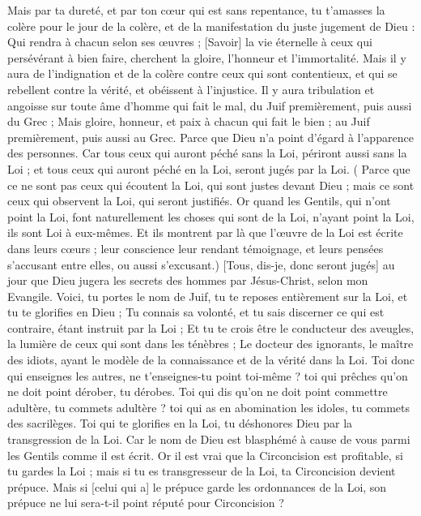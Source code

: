 \begin{multicols}{2}
Mais par ta dureté, et par ton cœur qui est sans repentance, tu t'amasses la colère pour le jour de la colère, et de la manifestation du juste jugement de Dieu :
Qui rendra à chacun selon ses œuvres ;
[Savoir] la vie éternelle à ceux qui persévérant à bien faire, cherchent la gloire, l'honneur et l'immortalité.
Mais il y aura de l'indignation et de la colère contre ceux qui sont contentieux, et qui se rebellent contre la vérité, et obéissent à l'injustice.
Il y aura tribulation et angoisse sur toute âme d'homme qui fait le mal, du Juif premièrement, puis aussi du Grec ;
Mais gloire, honneur, et paix à chacun qui fait le bien ; au Juif premièrement, puis aussi au Grec.
Parce que Dieu n'a point d'égard à l'apparence des personnes.
Car tous ceux qui auront péché sans la Loi, périront aussi sans la Loi ; et tous ceux qui auront péché en la Loi, seront jugés par la Loi.
( Parce que ce ne sont pas ceux qui écoutent la Loi, qui sont justes devant Dieu ; mais ce sont ceux qui observent la Loi, qui seront justifiés.
Or quand les Gentils, qui n'ont point la Loi, font naturellement les choses qui sont de la Loi, n'ayant point la Loi, ils sont Loi à eux-mêmes.
Et ils montrent par là que l'œuvre de la Loi est écrite dans leurs cœurs ; leur conscience leur rendant témoignage, et leurs pensées s'accusant entre elles, ou aussi s'excusant.)
[Tous, dis-je, donc seront jugés] au jour que Dieu jugera les secrets des hommes par Jésus-Christ, selon mon Evangile.
Voici, tu portes le nom de Juif, tu te reposes entièrement sur la Loi, et tu te glorifies en Dieu ;
Tu connais sa volonté, et tu sais discerner ce qui est contraire, étant instruit par la Loi ;
Et tu te crois être le conducteur des aveugles, la lumière de ceux qui sont dans les ténèbres ;
Le docteur des ignorants, le maître des idiots, ayant le modèle de la connaissance et de la vérité dans la Loi.
Toi donc qui enseignes les autres, ne t'enseignes-tu point toi-même ? toi qui prêches qu'on ne doit point dérober, tu dérobes.
Toi qui dis qu'on ne doit point commettre adultère, tu commets adultère ? toi qui as en abomination les idoles, tu commets des sacrilèges.
Toi qui te glorifies en la Loi, tu déshonores Dieu par la transgression de la Loi.
Car le nom de Dieu est blasphémé à cause de vous parmi les Gentils comme il est écrit.
Or il est vrai que la Circoncision est profitable, si tu gardes la Loi ; mais si tu es transgresseur de la Loi, ta Circoncision devient prépuce.
Mais si [celui qui a] le prépuce garde les ordonnances de la Loi, son prépuce ne lui sera-t-il point réputé pour Circoncision ?

\end{multicols}
